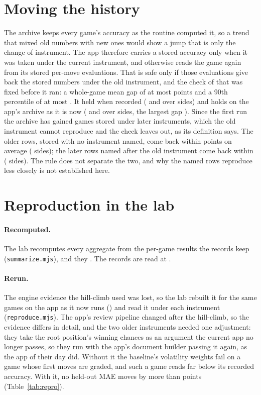 \documentclass[11pt]{article}
\begin{document}
\section{Moving the history}

The archive keeps every game's accuracy as the routine computed it, so a trend that mixed old
numbers with new ones would show a jump that is only the change of instrument. The app therefore
carries a stored accuracy only when it was taken under the current instrument, and otherwise reads
the game again from its stored per-move evaluations. That is safe only if those evaluations give
back the stored numbers under the old instrument, and the check of that was fixed before it ran:
a whole-game mean gap of at most \RereadRuleMae{} points and a 90th percentile of at most
\RereadRuleP. It held when recorded (\RereadRecordedMae{} and \RereadRecordedPNinety{} over
\RereadRecordedSides{} sides) and holds on the app's archive as it is now (\RereadMae{} and
\RereadPNinety{} over \RereadSides{} sides, the largest gap \RereadMax). Since the first run the
archive has gained \RereadLaterRows{} games stored under later instruments, which the old
instrument cannot reproduce and the check leaves out, as its definition says. The older rows,
stored with no instrument named, come back within \RereadUntaggedMae{} points on average
(\RereadUntaggedSides{} sides); the later rows named after the old instrument come back within
\RereadTaggedMae{} (\RereadTaggedSides{} sides). The rule does not separate the two, and why the
named rows reproduce less closely is not established here.

\section{Reproduction in the lab}

\paragraph{Recomputed.} The lab recomputes every aggregate from the per-game results the records
keep (\texttt{summarize.mjs}), and they \ReproAggregates. The records are read at \RecordsCommit.

\paragraph{Rerun.} The engine evidence the hill-climb used was lost, so the lab rebuilt it for
the same games on the app as it now runs (\AppCommit) and read it under each instrument
(\texttt{reproduce.mjs}). The app's review pipeline changed after the hill-climb, so the
evidence differs in detail, and the two older instruments needed one adjustment: they take the
root position's winning chances as an argument the current app no longer passes, so they run
with the app's document builder passing it again, as the app of their day did. Without it the
baseline's volatility weights fail on a game whose first moves are graded, and such a game reads
far below its recorded accuracy. With it, no held-out MAE moves by more than \ReproLargest{} points
(Table~\ref{tab:repro}).
\end{document}
